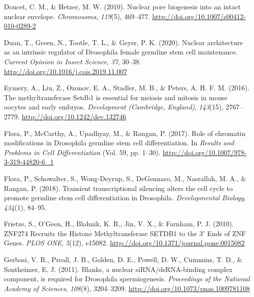 \documentclass[12pt,oneside]{reedthesis}
\begin{document}
\leavevmode\hypertarget{ref-doucetNuclearPoreBiogenesis2010}{}%
Doucet, C. M., \& Hetzer, M. W. (2010). Nuclear pore biogenesis into an intact nuclear envelope. \emph{Chromosoma}, \emph{119}(5), 469--477. \url{http://doi.org/10.1007/s00412-010-0289-2}

\leavevmode\hypertarget{ref-duanNuclearArchitectureIntrinsic2020}{}%
Duan, T., Green, N., Tootle, T. L., \& Geyer, P. K. (2020). Nuclear architecture as an intrinsic regulator of Drosophila female germline stem cell maintenance. \emph{Current Opinion in Insect Science}, \emph{37}, 30--38. \url{http://doi.org/10.1016/j.cois.2019.11.007}

\leavevmode\hypertarget{ref-eymeryMethyltransferaseSetdb1Essential2016}{}%
Eymery, A., Liu, Z., Ozonov, E. A., Stadler, M. B., \& Peters, A. H. F. M. (2016). The methyltransferase Setdb1 is essential for meiosis and mitosis in mouse oocytes and early embryos. \emph{Development (Cambridge, England)}, \emph{143}(15), 2767--2779. \url{http://doi.org/10.1242/dev.132746}

\leavevmode\hypertarget{ref-floraRoleChromatinModifications2017a}{}%
Flora, P., McCarthy, A., Upadhyay, M., \& Rangan, P. (2017). Role of chromatin modifications in Drosophila germline stem cell differentiation. In \emph{Results and Problems in Cell Differentiation} (Vol. 59, pp. 1--30). \url{http://doi.org/10.1007/978-3-319-44820-6_1}

\leavevmode\hypertarget{ref-floraTransientTranscriptionalSilencing2018}{}%
Flora, P., Schowalter, S., Wong-Deyrup, S., DeGennaro, M., Nasrallah, M. A., \& Rangan, P. (2018). Transient transcriptional silencing alters the cell cycle to promote germline stem cell differentiation in Drosophila. \emph{Developmental Biology}, \emph{434}(1), 84--95.

\leavevmode\hypertarget{ref-frietzeZNF274RecruitsHistone2010}{}%
Frietze, S., O'Geen, H., Blahnik, K. R., Jin, V. X., \& Farnham, P. J. (2010). ZNF274 Recruits the Histone Methyltransferase SETDB1 to the 3\({'}\) Ends of ZNF Genes. \emph{PLOS ONE}, \emph{5}(12), e15082. \url{http://doi.org/10.1371/journal.pone.0015082}

\leavevmode\hypertarget{ref-gerbasiBlanksNuclearSiRNA2011}{}%
Gerbasi, V. R., Preall, J. B., Golden, D. E., Powell, D. W., Cummins, T. D., \& Sontheimer, E. J. (2011). Blanks, a nuclear siRNA/dsRNA-binding complex component, is required for Drosophila spermiogenesis. \emph{Proceedings of the National Academy of Sciences}, \emph{108}(8), 3204--3209. \url{http://doi.org/10.1073/pnas.1009781108}
\end{document}
